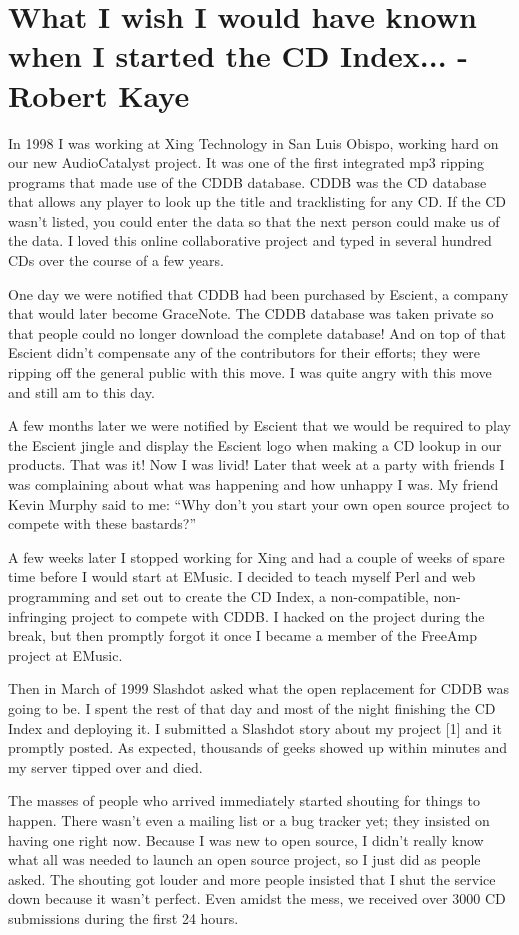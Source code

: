 \chapter{What I wish I would have known when I started the CD Index... - Robert Kaye}
In 1998 I was working at Xing Technology in San Luis Obispo, working hard on our new AudioCatalyst project. It was one of the first integrated mp3 ripping programs that made use of the CDDB database. CDDB was the CD database that allows any player to look up the title and tracklisting for any CD. If the CD wasn’t listed, you could enter the data so that the next person could make us of the data. I loved this online collaborative project and typed in several hundred CDs over the course of a few years.

One day we were notified that CDDB had been purchased by Escient, a company that would later become GraceNote. The CDDB database was taken private so that people could no longer download the complete database! And on top of that Escient didn’t compensate any of the contributors for their efforts; they were ripping off the general public with this move. I was quite angry with this move and still am to this day.

A few months later we were notified by Escient that we would be required to play the Escient jingle and display the Escient logo when making a CD lookup in our products. That was it! Now I was livid! Later that week at a party with friends I was complaining about what was happening and how unhappy I was. My friend Kevin Murphy said to me: “Why don’t you start your own open source project to compete with these bastards?”

A few weeks later I stopped working for Xing and had a couple of weeks of spare time before I would start at EMusic. I decided to teach myself Perl and web programming and set out to create the CD Index, a non-compatible, non-infringing project to compete with CDDB. I hacked on the project during the break, but then promptly forgot it once I became a member of the FreeAmp project at EMusic.

Then in March of 1999 Slashdot asked what the open replacement for CDDB was going to be. I spent the rest of that day and most of the night finishing the CD Index and deploying it. I submitted a Slashdot story about my project [1] and it promptly posted. As expected, thousands of geeks showed up within minutes and my server tipped over and died.

The masses of people who arrived immediately started shouting for things to happen. There wasn’t even a mailing list or a bug tracker yet; they insisted on having one right now. Because I was new to open source, I didn’t really know what all was needed to launch an open source project, so I just did as people asked.  The shouting got louder and more people insisted that I shut the service down because it wasn’t perfect. Even amidst the mess, we received over 3000 CD submissions during the first 24 hours.

